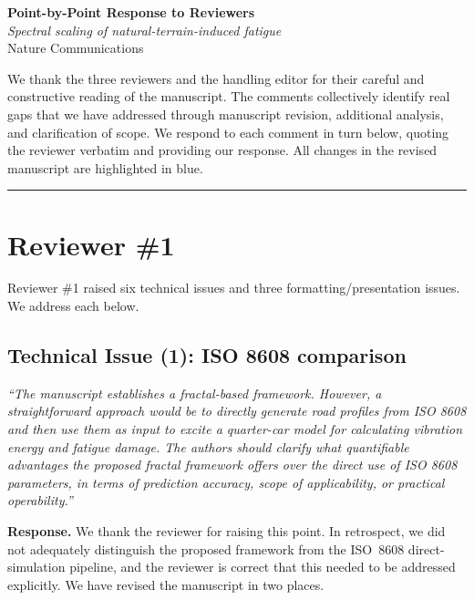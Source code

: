 \documentclass[11pt]{article}
\newcommand{\revquote}[1]{\medskip\noindent\textit{``#1''}\medskip}
\begin{document}
\begin{center}
{\large\bfseries Point-by-Point Response to Reviewers}\\[6pt]
\textit{Spectral scaling of natural-terrain-induced fatigue}\\[4pt]
Nature Communications\\[4pt]
\end{center}

\noindent We thank the three reviewers and the handling editor for their careful and constructive reading of the manuscript. The comments collectively identify real gaps that we have addressed through manuscript revision, additional analysis, and clarification of scope. We respond to each comment in turn below, quoting the reviewer verbatim and providing our response. All changes in the revised manuscript are highlighted in blue.

\bigskip\noindent\rule{\textwidth}{0.4pt}

\section*{Reviewer \#1}

\noindent Reviewer \#1 raised six technical issues and three formatting/presentation issues. We address each below.

\bigskip

\subsection*{Technical Issue (1): ISO 8608 comparison}

\revquote{The manuscript establishes a fractal-based framework. However, a straightforward approach would be to directly generate road profiles from ISO 8608 and then use them as input to excite a quarter-car model for calculating vibration energy and fatigue damage. The authors should clarify what quantifiable advantages the proposed fractal framework offers over the direct use of ISO 8608 parameters, in terms of prediction accuracy, scope of applicability, or practical operability.}

\noindent\textbf{Response.} We thank the reviewer for raising this point. In retrospect, we did not adequately distinguish the proposed framework from the ISO~8608 direct-simulation pipeline, and the reviewer is correct that this needed to be addressed explicitly. We have revised the manuscript in two places.
\end{document}
